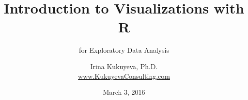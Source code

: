 \title{ Introduction to Visualizations with R \\}
\subtitle{for Exploratory Data Analysis}
\author{Irina Kukuyeva, Ph.D. \\ \ttfamily \url{www.KukuyevaConsulting.com} \normalfont}
\date{March 3, 2016}



\frame{ \titlepage }
